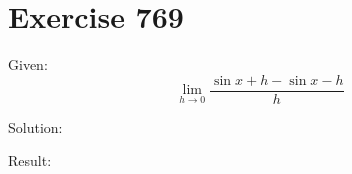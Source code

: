 \documentclass[a4paper, 10pt]{scrartcl}
\begin{document}
\section{Exercise 769}

Given:
\[\lim_{h\to 0}{\frac{\sin{x + h} - \sin{x - h}}{h}}\]

Solution:

Result:
\end{document}
